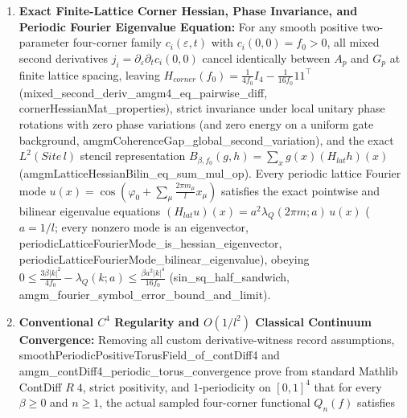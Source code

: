 \documentclass[american,11pt,letterpaper]{article}
\def\mathbb#1{#1}%
\def\mathbf#1{#1}%
\def\mathrm#1{#1}%
\def\texttt#1{#1}%
\begin{document}
\begin{enumerate}[leftmargin=2em]
  \item \textbf{Exact Finite-Lattice Corner Hessian, Phase Invariance, and Periodic Fourier Eigenvalue Equation:} For any smooth positive two-parameter four-corner family $c_i(\varepsilon, t)$ with $c_i(0,0) = f_0 > 0$, all mixed second derivatives $j_i = \partial_\varepsilon\partial_t c_i(0,0)$ cancel identically between $A_p$ and $G_p$ at finite lattice spacing, leaving $H_{\mathrm{corner}}(f_0) = \frac{1}{4f_0}I_4 - \frac{1}{16f_0}\mathbf{1}\mathbf{1}^\top$ (\texttt{mixed\_\allowbreak{}second\_\allowbreak{}deriv\_\allowbreak{}amgm4\_\allowbreak{}eq\_\allowbreak{}pairwise\_\allowbreak{}diff}, \texttt{cornerHessianMat\_\allowbreak{}properties}), strict invariance under local unitary phase rotations with zero phase variations (and zero energy on a uniform gate background, \texttt{amgmCoherenceGap\_\allowbreak{}global\_\allowbreak{}second\_\allowbreak{}variation}), and the exact $L^2(\mathrm{Site}\,l)$ stencil representation $B_{\beta,f_0}(g,h) = \sum_x g(x)(H_{\mathrm{lat}} h)(x)$ (\texttt{amgmLatticeHessianBilin\_\allowbreak{}eq\_\allowbreak{}sum\_\allowbreak{}mul\_\allowbreak{}op}). Every periodic lattice Fourier mode $u(x) = \cos(\varphi_0 + \sum_\mu \frac{2\pi m_\mu}{l} x_\mu)$ satisfies the exact pointwise and bilinear eigenvalue equations $(H_{\mathrm{lat}} u)(x) = a^2\lambda_Q(2\pi m; a)\,u(x)$ ($a = 1/l$; every nonzero mode is an eigenvector, \texttt{periodicLatticeFourierMode\_\allowbreak{}is\_\allowbreak{}hessian\_\allowbreak{}eigenvector}, \texttt{periodicLatticeFourierMode\_\allowbreak{}bilinear\_\allowbreak{}eigenvalue}), obeying $0 \le \frac{3\beta|k|^2}{4f_0} - \lambda_Q(k;a) \le \frac{\beta a^2|k|^4}{16f_0}$ (\texttt{sin\_\allowbreak{}sq\_\allowbreak{}half\_\allowbreak{}sandwich}, \texttt{amgm\_\allowbreak{}fourier\_\allowbreak{}symbol\_\allowbreak{}error\_\allowbreak{}bound\_\allowbreak{}and\_\allowbreak{}limit}).
  \item \textbf{Conventional $C^4$ Regularity and $O(1/l^2)$ Classical Continuum Convergence:} Removing all custom derivative-witness record assumptions, \texttt{smoothPeriodicPositiveTorusField\_\allowbreak{}of\_\allowbreak{}contDiff4} and \texttt{amgm\_\allowbreak{}contDiff4\_\allowbreak{}periodic\_\allowbreak{}torus\_\allowbreak{}convergence} prove from standard Mathlib \texttt{ContDiff} $\mathbb{R}\;4$, strict positivity, and $1$-periodicity on $[0,1]^4$ that for every $\beta \ge 0$ and $n \ge 1$, the actual sampled four-corner functional $Q_n(f)$ satisfies
  \begin{equation}

\end{equation}
\end{enumerate}
\end{document}
